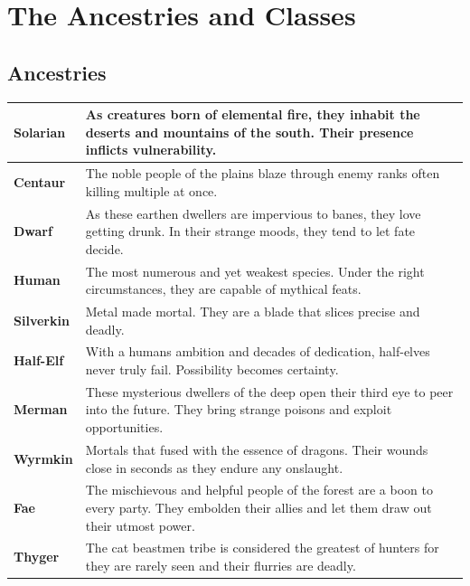 
\section{The Ancestries and Classes}\label{Section_CharDescription}

\subsection*{Ancestries}

\begin{longtable}{|p{2.5cm}|p{13.7cm}|}
	\hline
	\textbf{Solarian} \symFire&  As creatures born of elemental  fire, they inhabit the deserts and mountains of the south. Their presence inflicts vulnerability.\\
	\hline
	\textbf{Centaur}&  The noble people  of the plains blaze through enemy ranks often killing multiple at once.\\
	\hline
	\textbf{Dwarf} \symEarth&  As these earthen dwellers are impervious to banes, they love getting drunk. In their strange moods, they tend to let fate decide.\\
	\hline
	\textbf{Human}&  The most numerous and yet weakest species. Under the right circumstances, they are capable of mythical feats.\\
	\hline
	\textbf{Silverkin} \symMetal& Metal made mortal. They are a blade that slices precise and deadly.\\
	\hline
	\textbf{Half-Elf}&  With a humans ambition and decades of dedication, half-elves never truly fail. Possibility becomes certainty.\\
	\hline
	\textbf{Merman} \symWater&  These mysterious dwellers of the deep open their third eye to peer into the future. They bring strange poisons and exploit opportunities.\\
	\hline
	\textbf{Wyrmkin}&  Mortals that fused with the essence of dragons. %
	Their wounds close in seconds as they endure any onslaught.\\
	\hline
	\textbf{Fae} \symWood&  The mischievous and helpful people of the forest are a boon to every party. They embolden their allies and let them draw out their utmost power.\\
	\hline
	\textbf{Thyger}&  The cat beastmen tribe is considered the greatest of hunters for they are rarely seen and their flurries are deadly.\\
	\hline
\end{longtable}

